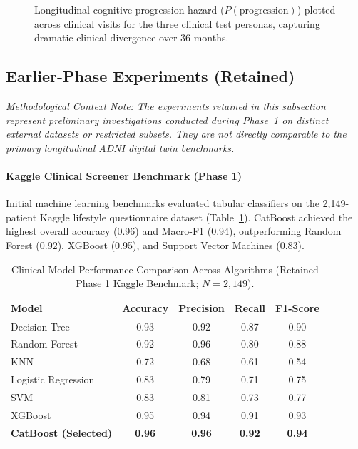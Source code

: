 \documentclass[11pt,a4paper]{article}
\begin{document}
\begin{figure}[t]
\centering
{}
\caption{Longitudinal cognitive progression hazard ($P(\text{progression})$) plotted across clinical visits for the three clinical test personas, capturing dramatic clinical divergence over 36 months.}
\label{fig:risk_over_visits}
\end{figure}

\subsection{Earlier-Phase Experiments (Retained)}
\label{sec:results_earlier_phase}
\textit{Methodological Context Note: The experiments retained in this subsection represent preliminary investigations conducted during Phase~1 on distinct external datasets or restricted subsets. They are not directly comparable to the primary longitudinal ADNI digital twin benchmarks.}

\paragraph{Kaggle Clinical Screener Benchmark (Phase 1)}
Initial machine learning benchmarks evaluated tabular classifiers on the 2,149-patient Kaggle lifestyle questionnaire dataset (Table~\ref{tab:clinical_models_kaggle}). CatBoost achieved the highest overall accuracy (0.96) and Macro-F1 (0.94), outperforming Random Forest (0.92), XGBoost (0.95), and Support Vector Machines (0.83).

\begin{table}[H]
\centering
\caption{Clinical Model Performance Comparison Across Algorithms (Retained Phase 1 Kaggle Benchmark; $N = 2,149$).}
\label{tab:clinical_models_kaggle}
\small
\begin{tabular}{|l|c|c|c|c|}
\hline
\textbf{Model} & \textbf{Accuracy} & \textbf{Precision} & \textbf{Recall} & \textbf{F1-Score} \\
\hline
Decision Tree & 0.93 & 0.92 & 0.87 & 0.90 \\
Random Forest & 0.92 & 0.96 & 0.80 & 0.88 \\
KNN & 0.72 & 0.68 & 0.61 & 0.54 \\
Logistic Regression & 0.83 & 0.79 & 0.71 & 0.75 \\
SVM & 0.83 & 0.81 & 0.73 & 0.77 \\
XGBoost & 0.95 & 0.94 & 0.91 & 0.93 \\
\textbf{CatBoost (Selected)} & \textbf{0.96} & \textbf{0.96} & \textbf{0.92} & \textbf{0.94} \\
\hline
\end{tabular}
\end{table}
\end{document}
